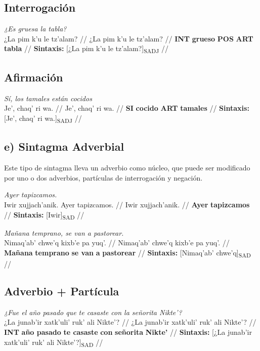 \documentclass{article}%
\begin{document}
\subsection{Interrogación}%
\label{subsec:Interrogacin}%

%
\par\medskip%
\ex
\textit{¿Es gruesa la tabla?} \\
\begingl
\gla ¿La pim k'u le tz'alam? //
\glb ¿La pim k'u le tz'alam? //
\glc \textbf{INT} \textbf{grueso} \textbf{POS} \textbf{ART} \textbf{tabla} //
\glft \textbf{Sintaxis:} [¿La pim k'u le tz'alam?]\textsubscript{SADJ} //
\endgl
\xe
%
\medskip%
\subsection{Afirmación}%
\label{subsec:Afirmacin}%

%
\par\medskip%
\ex
\textit{Sí, los tamales están cocidos} \\
\begingl
\gla Je', chaq' ri wa. //
\glb Je', chaq' ri wa. //
\glc \textbf{SI} \textbf{cocido} \textbf{ART} \textbf{tamales} //
\glft \textbf{Sintaxis:} [Je', chaq' ri wa.]\textsubscript{SADJ} //
\endgl
\xe
%
\medskip%
\subsection{e) Sintagma Adverbial}%
\label{subsec:e)SintagmaAdverbial}%

%
Este tipo de sintagma lleva un adverbio como núcleo, que puede ser modificado por uno %
o dos adverbios, partículas de interrogación y negación. %
\par\medskip%
\ex
\textit{Ayer tapizcamos.} \\
\begingl
\gla Iwir xujjach'anik. Ayer tapizcamos. //
\glb Iwir xujjach'anik. //
\glc \textbf{Ayer} \textbf{tapizcamos} //
\glft \textbf{Sintaxis:} [Iwir]\textsubscript{SAD} //
\endgl
\xe
%
\medskip%
\par\medskip%
\ex
\textit{Mañana temprano, se van a pastorear.} \\
\begingl
\gla Nimaq'ab' chwe'q kixb'e pa yuq'. //
\glb Nimaq'ab' chwe'q kixb'e pa yuq'. //
\glc \textbf{Mañana} \textbf{temprano} \textbf{se van} \textbf{a} \textbf{pastorear} //
\glft \textbf{Sintaxis:} [Nimaq'ab' chwe'q]\textsubscript{SAD} //
\endgl
\xe
%
\medskip%
\subsection{Adverbio + Partícula}%
\label{subsec:Adverbio+Partcula}%

%
\par\medskip%
\ex
\textit{¿Fue el año pasado que te casaste con la señorita Nikte'?} \\
\begingl
\gla ¿La junab'ir xatk'uli' ruk' ali Nikte'? //
\glb ¿La junab'ir xatk'uli' ruk' ali Nikte'? //
\glc \textbf{INT} \textbf{año pasado} \textbf{te casaste} \textbf{con} \textbf{señorita} \textbf{Nikte'} //
\glft \textbf{Sintaxis:} [¿La junab'ir xatk'uli' ruk' ali Nikte'?]\textsubscript{SAD} //
\endgl
\xe
%
\medskip

%
\end{document}
